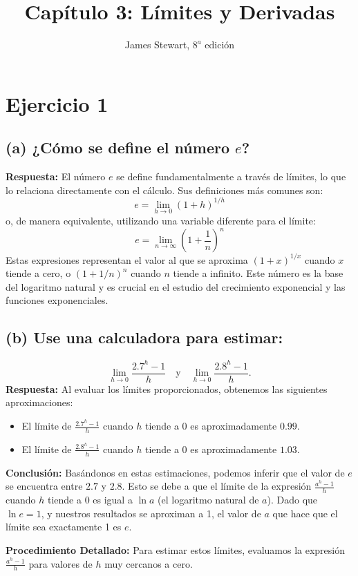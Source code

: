 \documentclass[12pt, a4paper]{article}
\title{Capítulo 3: Límites y Derivadas}
\author{James Stewart, $8^{a}$ edición}
\date{} %
\begin{document}
\maketitle
\tableofcontents
\newpage

\section{Ejercicio 1}

\subsection{(a) ¿Cómo se define el número $e$?}
\textbf{Respuesta:}
El número $e$ se define fundamentalmente a través de límites, lo que lo relaciona directamente con el cálculo. Sus definiciones más comunes son:
\[e = \lim_{h\to 0} (1 + h)^{1/h}\]
o, de manera equivalente, utilizando una variable diferente para el límite:
\[e=\lim_{n\to\infty}\left(1+\frac{1}{n}\right)^n\]
Estas expresiones representan el valor al que se aproxima $(1+x)^{1/x}$ cuando $x$ tiende a cero, o $(1+1/n)^n$ cuando $n$ tiende a infinito. Este número es la base del logaritmo natural y es crucial en el estudio del crecimiento exponencial y las funciones exponenciales.

\subsection{(b) Use una calculadora para estimar:}
\[\lim_{h\to 0} \frac{2.7^h - 1}{h} \quad \text{y} \quad \lim_{h\to 0} \frac{2.8^h - 1}{h}.\]
\textbf{Respuesta:}
Al evaluar los límites proporcionados, obtenemos las siguientes aproximaciones:
\begin{itemize}
    \item El límite de $\frac{2.7^h-1}{h}$ cuando $h$ tiende a 0 es aproximadamente $0.99$.
    \item El límite de $\frac{2.8^h-1}{h}$ cuando $h$ tiende a 0 es aproximadamente $1.03$.
\end{itemize}
\textbf{Conclusión:}
Basándonos en estas estimaciones, podemos inferir que el valor de $e$ se encuentra entre $2.7$ y $2.8$. Esto se debe a que el límite de la expresión $\frac{a^h-1}{h}$ cuando $h$ tiende a 0 es igual a $\ln a$ (el logaritmo natural de $a$). Dado que $\ln e=1$, y nuestros resultados se aproximan a 1, el valor de $a$ que hace que el límite sea exactamente 1 es $e$.

\textbf{Procedimiento Detallado:}
Para estimar estos límites, evaluamos la expresión $\frac{a^h-1}{h}$ para valores de $h$ muy cercanos a cero.
\end{document}
